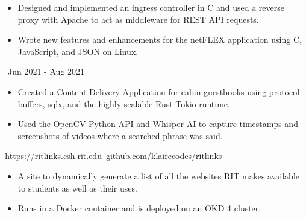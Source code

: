\documentclass[11pt,letterpaper,ragged2e]{altacv}
\begin{document}
{
	\begin{itemize}
		\item Designed and implemented an ingress controller in C and used a reverse proxy with Apache to act as middleware for REST API requests.
		\item Wrote new features and enhancements for the netFLEX application using C,  JavaScript, and JSON on Linux.
	\end{itemize}
}
{\faCalendar\, Jun 2021 - Aug 2021}
{
}



{
	\begin{itemize}
		\item Created a Content Delivery Application for cabin guestbooks using protocol buffers, sqlx, and the highly scalable Rust Tokio runtime.
	\end{itemize}
}
{
}

{
	\begin{itemize}
		\item Used the OpenCV Python API and Whisper AI to capture timestamps and screenshots of videos where a searched phrase was said.
	\end{itemize}
}
{
}

{
	{\faLink} \,\href{https://ritlinks.csh.rit.edu}{https://ritlinks.csh.rit.edu}\quad
	{\faGithub} \,\href{https://github.com/klairecodes/ritlinks}{github.com/klairecodes/ritlinks}
}
{
	\begin{itemize}
		\item A site to dynamically generate a list of all the websites RIT makes available to students as well as their uses.
		\item Runs in a Docker container and is deployed on an OKD 4 cluster.
	\end{itemize}
}
{
}


\clearpage

\nocite{*}
\end{document}
